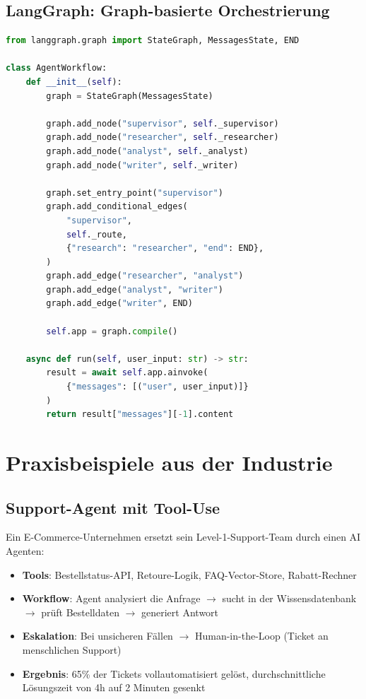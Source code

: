 \subsection{LangGraph: Graph-basierte Orchestrierung}

\begin{lstlisting}[language=Python, caption=Multi-Agent-Workflow mit LangGraph]
from langgraph.graph import StateGraph, MessagesState, END

class AgentWorkflow:
    def __init__(self):
        graph = StateGraph(MessagesState)

        graph.add_node("supervisor", self._supervisor)
        graph.add_node("researcher", self._researcher)
        graph.add_node("analyst", self._analyst)
        graph.add_node("writer", self._writer)

        graph.set_entry_point("supervisor")
        graph.add_conditional_edges(
            "supervisor",
            self._route,
            {"research": "researcher", "end": END},
        )
        graph.add_edge("researcher", "analyst")
        graph.add_edge("analyst", "writer")
        graph.add_edge("writer", END)

        self.app = graph.compile()

    async def run(self, user_input: str) -> str:
        result = await self.app.ainvoke(
            {"messages": [("user", user_input)]}
        )
        return result["messages"][-1].content
\end{lstlisting}

\section{Praxisbeispiele aus der Industrie}

\subsection{Support-Agent mit Tool-Use}

Ein E-Commerce-Unternehmen ersetzt sein Level-1-Support-Team durch einen AI Agenten:

\begin{itemize}[leftmargin=*]
    \item \textbf{Tools}: Bestellstatus-API, Retoure-Logik, FAQ-Vector-Store, Rabatt-Rechner
    \item \textbf{Workflow}: Agent analysiert die Anfrage $\rightarrow$ sucht in der Wissensdatenbank $\rightarrow$ prüft Bestelldaten $\rightarrow$ generiert Antwort
    \item \textbf{Eskalation}: Bei unsicheren Fällen $\rightarrow$ Human-in-the-Loop (Ticket an menschlichen Support)
    \item \textbf{Ergebnis}: 65\% der Tickets vollautomatisiert gelöst, durchschnittliche Lösungszeit von 4h auf 2 Minuten gesenkt
\end{itemize}

